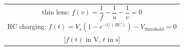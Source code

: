 \documentclass[border=12pt]{standalone}
\begin{document}
\color{weeknavy}
\begin{tabular}{c}
thin lens: $f(v)=\dfrac{1}{f}-\dfrac{1}{u}-\dfrac{1}{v}=0$\\[10pt]
RC charging: $f(t)=V_s\left(1-e^{-t/(RC)}\right)-V_{\mathrm{threshold}}=0$\\[-1pt]
\hfill [$f(t)$ in $\mathrm{V}$, $t$ in $\mathrm{s}$]
\end{tabular}
\end{document}
